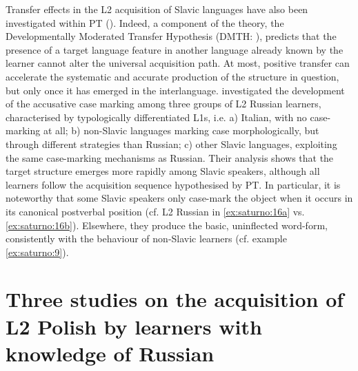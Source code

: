 \documentclass[output=paper,            colorlinks, citecolor=brown            		  ]{langscibook}
\begin{document}
Transfer effects in the L2 acquisition of Slavic languages have also been investigated within PT (). Indeed, a component of the theory, the Developmentally Moderated Transfer Hypothesis (DMTH: \citealt{HåkanssonEtAl2002, PienemannEtAl2016}), predicts that the presence of a target language feature in another language already known by the learner cannot alter the universal acquisition path. At most, positive transfer can accelerate the systematic and accurate production of the structure in question, but only once it has emerged in the interlanguage. \citet{MagnaniArtoni2021} investigated the development of the accusative case marking among three groups of L2 Russian learners, characterised by typologically differentiated L1s, i.e. a) Italian, with no case-marking at all; b) non-Slavic languages marking case morphologically, but through different strategies than Russian; c) other Slavic languages, exploiting the same case-marking mechanisms as Russian. Their analysis shows that the target structure emerges more rapidly among Slavic speakers, although all learners follow the acquisition sequence hypothesised by PT. In particular, it is noteworthy that some Slavic speakers only case-mark the object when it occurs in its canonical postverbal position (cf. L2 Russian in \ref{ex:saturno:16a} vs. \ref{ex:saturno:16b}). Elsewhere, they produce the basic, uninflected word-form, consistently with the behaviour of non-Slavic learners (cf. example \ref{ex:saturno:9}).

\ea\label{ex:saturno:16}  

    \z
\z

\section{Three studies on the acquisition of L2 Polish by learners with knowledge of Russian}
\label{sec:saturno:3}
\end{document}
